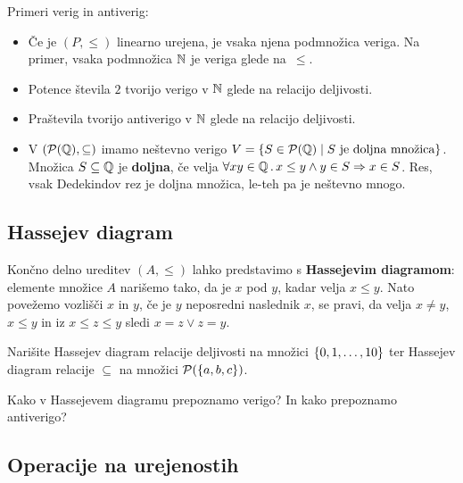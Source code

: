 \begin{primer}
\end{primer}

\begin{primer}
  Primeri verig in antiverig:
  \begin{itemize}
  \item Če je $(P, {\leq})$ linearno urejena, je vsaka njena podmnožica veriga. Na primer, vsaka podmnožica $\mathbb{N}$ je veriga glede na~$\leq$.
  \item Potence števila $2$ tvorijo verigo v $\mathbb{N}$ glede na relacijo deljivosti.
  \item Praštevila tvorijo antiverigo v $\mathbb{N}$ glede na relacijo deljivosti.
  \item V $(\mathcal{P}(\mathbb{Q}), {\subseteq})$ imamo neštevno verigo
    $V = \left\{S \in \mathcal{P}(\mathbb{Q}) \mid \text{$S$ je doljna množica}\right\}$.
    Množica $S \subseteq \mathbb{Q}$ je \textbf{doljna}, če velja
    $\forall x y \in \mathbb{Q} \,.\, x \leq y \land y \in S \Rightarrow x \in S$.
    Res, vsak Dedekindov rez je doljna množica, le-teh pa je neštevno mnogo.
  \end{itemize}
\end{primer}



\subsection{Hassejev diagram}

Končno delno ureditev $(A, \leq)$ lahko predstavimo s \textbf{Hassejevim diagramom}: elemente
množice $A$ narišemo tako, da je $x$ pod $y$, kadar velja $x \leq y$. Nato povežemo vozlišči $x$ in $y$, če je $y$ neposredni naslednik $x$, se pravi, da velja $x \neq y$, $x \leq y$ in iz $x \leq z \leq y$ sledi $x = z \lor z = y$.

\begin{naloga}
  Narišite Hassejev diagram relacije deljivosti na množici $\left\{0, 1, \dots, 10\right\}$ ter
  Hassejev diagram relacije $\subseteq$ na množici $\mathcal{P}(\{a,b,c\})$.
\end{naloga}

\begin{naloga}
  Kako v Hassejevem diagramu prepoznamo verigo? In kako prepoznamo antiverigo?
\end{naloga}


\subsection{Operacije na urejenostih}

